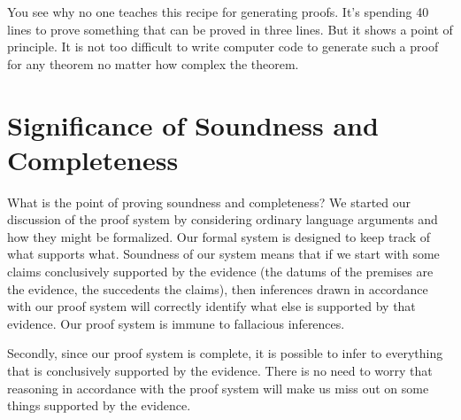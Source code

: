 \begin{argumentN}[1]









\end{argumentN}


\normalsize

\setlength{\parindent}{0em}
You see why no one teaches this recipe for generating proofs. It's spending 40 
lines to prove something that can be proved in three lines.  But it shows a 
point of principle.  It is not too difficult to write computer code to generate 
such a proof for any theorem no matter how complex the theorem.  












\section{Significance of Soundness and Completeness}

What is the point of proving soundness and completeness?  We started our 
discussion of the proof system by considering ordinary language arguments and 
how they might be formalized. Our formal system is designed to keep track of
what supports what. Soundness of our system means that if we start with some 
claims conclusively supported by the evidence (the datums of the premises are 
the evidence, the succedents the claims), then inferences drawn in accordance 
with our proof system will correctly identify what else is supported by that 
evidence. Our proof system is immune to fallacious inferences. 

Secondly, since our proof system is complete, it is possible to infer to 
everything that is conclusively supported by the evidence. There is no need to 
worry that reasoning in accordance with the proof system will make us miss out 
on some things supported by the evidence. 

